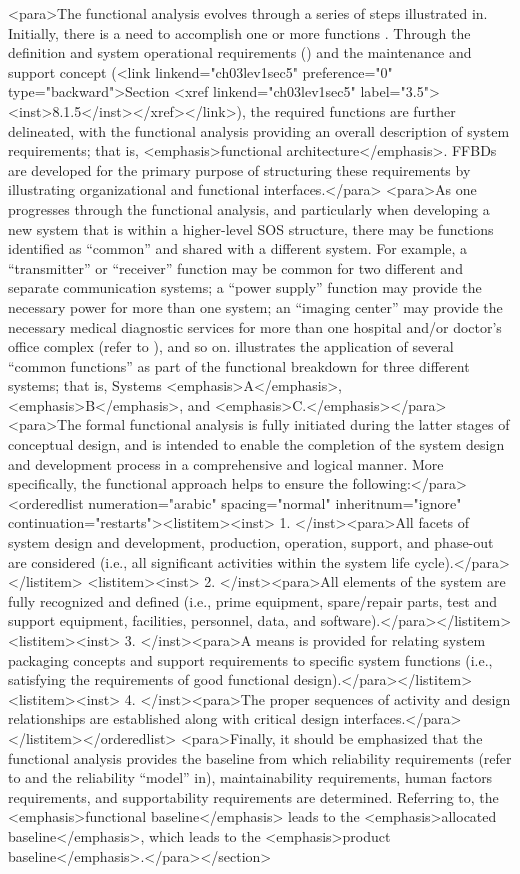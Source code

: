 <para>The functional analysis evolves through a series of steps illustrated in. Initially, there is a need to accomplish one or more functions . Through the definition and system operational requirements () and the maintenance and support concept (<link linkend="ch03lev1sec5" preference="0" type="backward">Section <xref linkend="ch03lev1sec5" label="3.5"><inst>8.1.5</inst></xref></link>), the required functions are further delineated, with the functional analysis providing an overall description of system requirements; that is, <emphasis>functional architecture</emphasis>. FFBDs are developed for the primary purpose of structuring these requirements by illustrating organizational and functional interfaces.</para>
<para>As one progresses through the functional analysis, and particularly when developing a new system that is within a higher-level SOS structure, there may be functions identified as “common” and shared with a different system. For example, a “transmitter” or “receiver” function may be common for two different and separate communication systems; a “power supply” function may provide the necessary power for more than one system; an “imaging center” may provide the necessary medical diagnostic services for more than one hospital and/or doctor’s office complex (refer to ), and so on. illustrates the application of several “common functions” as part of the functional breakdown for three different systems; that is, Systems <emphasis>A</emphasis>, <emphasis>B</emphasis>, and <emphasis>C.</emphasis></para>
<para>The formal functional analysis is fully initiated during the latter stages of conceptual design, and is intended to enable the completion of the system design and development process in a comprehensive and logical manner. More specifically, the functional approach helps to ensure the following:</para>
<orderedlist numeration="arabic" spacing="normal" inheritnum="ignore" continuation="restarts"><listitem><inst>	1.	</inst><para>All facets of system design and development, production, operation, support, and phase-out are considered (i.e., all significant activities within the system life cycle).</para></listitem>
<listitem><inst>	2.	</inst><para>All elements of the system are fully recognized and defined (i.e., prime equipment, spare/repair parts, test and support equipment, facilities, personnel, data, and software).</para></listitem>
<listitem><inst>	3.	</inst><para>A means is provided for relating system packaging concepts and support requirements to specific system functions (i.e., satisfying the requirements of good functional design).</para></listitem>
<listitem><inst>	4.	</inst><para>The proper sequences of activity and design relationships are established along with critical design interfaces.</para></listitem></orderedlist>
<para>Finally, it should be emphasized that the functional analysis provides the baseline from which reliability requirements (refer to and the reliability “model” in), maintainability requirements, human factors requirements, and supportability requirements are determined. Referring to, the <emphasis>functional baseline</emphasis> leads to the <emphasis>allocated baseline</emphasis>, which leads to the <emphasis>product baseline</emphasis>.</para></section>

